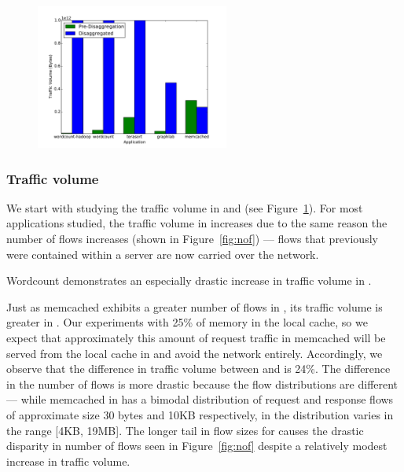 %
\begin{figure}
  \centering
    \includegraphics[width = 2.5in]{img/graph5_trafficvolume} 
  \caption{\small{}}
  \label{fig:vol}
\end{figure}
%
\subsubsection{Traffic volume}
\label{sssec:tfvol}
We start with studying the traffic volume in \dis and \pdis (see Figure~\ref{fig:vol}). For most applications studied, the traffic volume in \dis increases due to the same reason the number of flows increases (shown in Figure~\ref{fig:nof}) --- flows that previously were contained within a server are now carried over the network.

Wordcount demonstrates an especially drastic increase in traffic volume in \dis. 

Just as memcached exhibits a greater number of flows in \pdis, its traffic volume is greater in \dis. Our experiments with 25\% of memory in the local cache, so we expect that approximately this amount of request traffic in memcached will be served from the local cache in \dis and avoid the network entirely. Accordingly, we observe that the difference in traffic volume between \dis and \pdis is 24\%. The difference in the number of flows is more drastic because the flow distributions are different --- while memcached in \pdis has a bimodal distribution of request and response flows of approximate size 30 bytes and 10KB respectively, in \dis the distribution varies in the range [4KB, 19MB]. The longer tail in flow sizes for \dis causes the drastic disparity in number of flows seen in Figure~\ref{fig:nof} despite a relatively modest increase in traffic volume.


